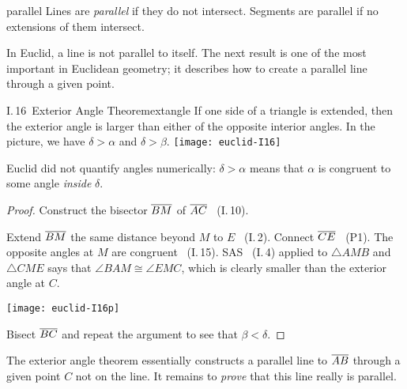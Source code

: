 \goodbreak


\begin{defn}{}{parallel}
Lines are \emph{parallel} if they do not intersect. Segments are parallel if no extensions of them intersect.
\end{defn}

In Euclid, a line is not parallel to itself. The next result is one of the most important in Euclidean geometry; it describes how to create a parallel line through a given point.


\begin{thm}[lower separated=false, sidebyside, sidebyside align=top seam, sidebyside gap=0pt, righthand width=0.37\linewidth]{I.\,16\ Exterior Angle Theorem}{extangle}
If one side of a triangle is extended, then the exterior angle is larger than either of the opposite interior angles.\smallbreak
In the picture, we have $\delta>\alpha$ and $\delta>\beta$.
\tcblower
\flushright\texttt{[image: euclid-I16]}
\end{thm}

Euclid did not quantify angles numerically: $\delta>\alpha$ means that $\alpha$ is congruent to some angle \emph{inside} $\delta$.

\begin{proof}
Construct the bisector $\overline{BM}$ of $\overline{AC}$ \ (I.\,10).\par
\begin{minipage}[t]{0.62\linewidth}\vspace{-5pt}
Extend $\overline{BM}$ the same distance beyond $M$ to $E$ \ (I.\,2).\smallbreak
Connect $\overline{CE}$ \ (P1).\smallbreak
The opposite angles at $M$ are congruent \ (I.\,15).\smallbreak
SAS \ (I.\,4) applied to $\triangle AMB$ and $\triangle CME$ says that $\angle BAM\cong\angle EMC$, which is clearly smaller than the exterior angle at $C$.
\end{minipage}\hfill\begin{minipage}[t]{0.37\linewidth}\vspace{-20pt}
\flushright\texttt{[image: euclid-I16p]}
\end{minipage}\smallbreak
Bisect $\overline{BC}$ and repeat the argument to see that $\beta<\delta$.
\end{proof}


The exterior angle theorem essentially constructs a parallel line to $\overline{AB}$ through a given point $C$ not on the line. It remains to \emph{prove} that this line really is parallel.

